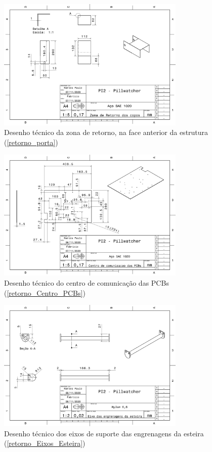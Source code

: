 \begin{apendicesenv}
\begin{figure}[H]
    \centering
    \includegraphics[width=0.8\textwidth]{figuras/estrutura/Desenhos/Zona_retorno.pdf}
    \caption{Desenho técnico da zona de retorno, na face anterior da estrutura (\ref{retorno_porta})}
    \label{fig:zona_retorno}
\end{figure}

\begin{figure}[H]
    \centering
    \includegraphics[width=0.8\textwidth]{figuras/estrutura/Desenhos/Centro_PCBs.pdf}
    \caption{Desenho técnico do centro de comunicação das PCBs (\ref{retorno_Centro_PCBs})}
    \label{fig:Centro_PCBs}
\end{figure}

\begin{figure}[H]
    \centering
    \includegraphics[width=0.8\textwidth]{figuras/estrutura/Desenhos/Eixo_Esteira.pdf}
    \caption{Desenho técnico dos eixos de suporte das engrenagens da esteira (\ref{retorno_Eixos_Esteira})}
    \label{fig:Eixos_Esteira}
\end{figure}


\end{apendicesenv}

